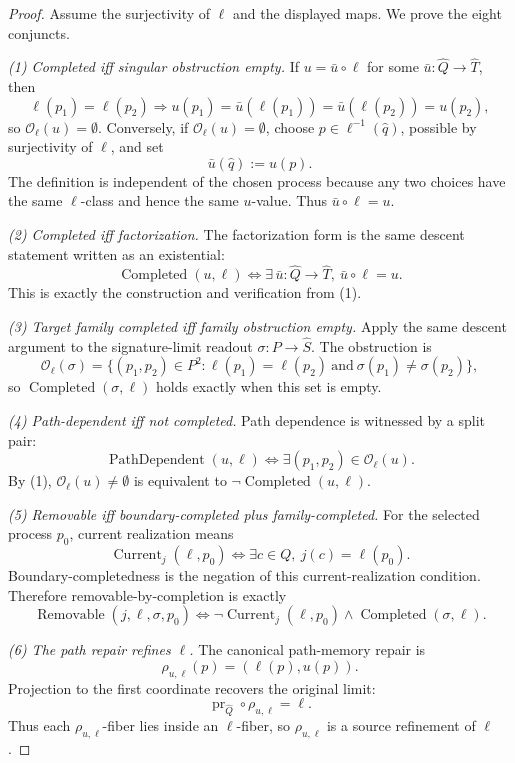 \documentclass[11pt]{article}
\theoremstyle{definition}
\begin{document}
\begin{proof}
Assume the surjectivity of \(\ell\) and the displayed maps.  We prove
the eight conjuncts.

\emph{(1) Completed iff singular obstruction empty.}
If \(u=\bar u\circ\ell\) for some
\(\bar u:\widehat Q\to\widehat T\), then
\[
  \ell(p_1)=\ell(p_2)
  \Longrightarrow
  u(p_1)=\bar u(\ell(p_1))=\bar u(\ell(p_2))=u(p_2),
\]
so \(\mathcal O_{\ell}(u)=\emptyset\).  Conversely, if
\(\mathcal O_{\ell}(u)=\emptyset\), choose
\(p\in\ell^{-1}(\hat q)\), possible by surjectivity of \(\ell\), and
set
\[
  \bar u(\hat q):=u(p).
\]
The definition is independent of the chosen process because any two
choices have the same \(\ell\)-class and hence the same \(u\)-value.
Thus \(\bar u\circ\ell=u\).

\emph{(2) Completed iff factorization.}
The factorization form is the same descent statement written as an
existential:
\[
  \operatorname{Completed}(u,\ell)
  \iff
  \exists\,\bar u:\widehat Q\to\widehat T,\ \bar u\circ\ell=u.
\]
This is exactly the construction and verification from (1).

\emph{(3) Target family completed iff family obstruction empty.}
Apply the same descent argument to the signature-limit readout
\(\sigma:P\to\widehat S\).  The obstruction is
\[
  \mathcal O_{\ell}(\sigma)
  =
  \{(p_1,p_2)\in P^2:
      \ell(p_1)=\ell(p_2)\ \text{and}\ \sigma(p_1)\ne\sigma(p_2)\},
\]
so \(\operatorname{Completed}(\sigma,\ell)\) holds exactly when this
set is empty.

\emph{(4) Path-dependent iff not completed.}
Path dependence is witnessed by a split pair:
\[
  \operatorname{PathDependent}(u,\ell)
  \iff
  \exists(p_1,p_2)\in\mathcal O_{\ell}(u).
\]
By (1), \(\mathcal O_{\ell}(u)\ne\emptyset\) is equivalent to
\(\neg\operatorname{Completed}(u,\ell)\).

\emph{(5) Removable iff boundary-completed plus family-completed.}
For the selected process \(p_0\), current realization means
\[
  \operatorname{Current}_{j}(\ell,p_0)
  \iff
  \exists c\in Q,\ j(c)=\ell(p_0).
\]
Boundary-completedness is the negation of this current-realization
condition.  Therefore removable-by-completion is exactly
\[
  \operatorname{Removable}(j,\ell,\sigma,p_0)
  \iff
  \neg\operatorname{Current}_{j}(\ell,p_0)
  \wedge
  \operatorname{Completed}(\sigma,\ell).
\]

\emph{(6) The path repair refines \(\ell\).}
The canonical path-memory repair is
\[
  \rho_{u,\ell}(p)=(\ell(p),u(p)).
\]
Projection to the first coordinate recovers the original limit:
\[
  \operatorname{pr}_{\widehat Q}\circ\rho_{u,\ell}=\ell.
\]
Thus each \(\rho_{u,\ell}\)-fiber lies inside an \(\ell\)-fiber, so
\(\rho_{u,\ell}\) is a source refinement of \(\ell\).


\end{proof}
\end{document}
